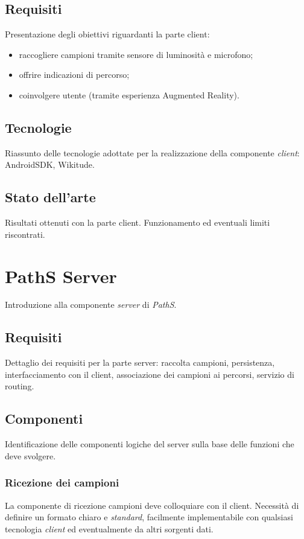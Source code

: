\documentclass[a4paper, 12pt, twoside, openright]{book}
\begin{document}
\section{Requisiti}
Presentazione degli obiettivi riguardanti la parte client:
\begin{itemize}
\item raccogliere campioni tramite sensore di luminosità e microfono;
\item offrire indicazioni di percorso;
\item coinvolgere utente (tramite esperienza Augmented Reality).
\end{itemize}

\section{Tecnologie}
Riassunto delle tecnologie adottate per la realizzazione della componente \emph{client}: AndroidSDK, Wikitude.

\section{Stato dell'arte}
Risultati ottenuti con la parte client. Funzionamento ed eventuali limiti riscontrati.

\chapter{PathS Server} %
\thispagestyle{empty}

Introduzione alla componente \emph{server} di \emph{PathS}. 

\section{Requisiti}
Dettaglio dei requisiti per la parte server: raccolta campioni, persistenza, interfacciamento con il client, associazione dei campioni ai percorsi, servizio di routing.

\section{Componenti}
Identificazione delle componenti logiche del server sulla base delle funzioni che deve svolgere.
\subsection{Ricezione dei campioni}
La componente di ricezione campioni deve colloquiare con il client. Necessità di definire un formato chiaro e \emph{standard}, facilmente implementabile con qualsiasi tecnologia \emph{client} ed eventualmente da altri sorgenti dati.
\end{document}
